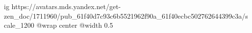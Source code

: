  
 
 
 
 

\ifcmt
  ig https://avatars.mds.yandex.net/get-zen_doc/1711960/pub_61f40d7c93c6b5521962f90a_61f40ecbc502762644399c3a/scale_1200
	@wrap center
	@width 0.5
\fi

